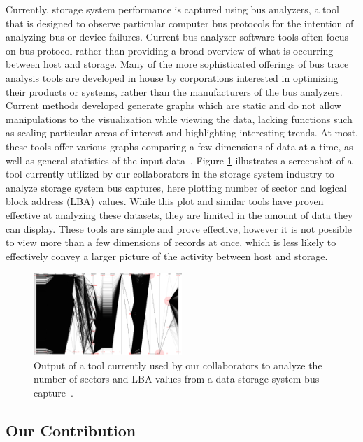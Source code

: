 \documentclass[journal]{vgtc}                %
\begin{document}
Currently, storage system performance is captured using bus analyzers, a tool that is designed to observe particular computer bus protocols for the intention of analyzing bus or device failures. Current bus analyzer software tools often focus on bus protocol rather than providing a broad overview of what is occurring between host and storage. Many of the more sophisticated offerings of bus trace analysis tools are developed in house by corporations interested in optimizing their products or systems, rather than the manufacturers of the bus analyzers. Current methods developed generate graphs which are static and do not allow manipulations to the visualization while viewing the data, lacking functions such as scaling particular areas of interest and highlighting interesting trends. At most, these tools offer various graphs comparing a few dimensions of data at a time, as well as general statistics of the input data~\cite{internal:understanding}. Figure \ref{fig:prev_tool2} illustrates a screenshot of a tool currently utilized by our collaborators in the storage system industry to analyze storage system bus captures, here plotting number of sector and logical block address (LBA) values. While this plot and similar tools have proven effective at analyzing these datasets, they are limited in the amount of data they can display. These tools are simple and prove effective, however it is not possible to view more than a few dimensions of records at once, which is less likely to effectively convey a larger picture of the activity between host and storage.

\begin{figure}[h!]
 \centering
 \includegraphics[width=0.5\textwidth]{images/prev_tool2.eps}
 \caption[Output of a tool currently used to analyze workload datasets.]{Output of a tool currently used by our collaborators to analyze the number of sectors and LBA values from a data storage system bus capture~\cite{internal:collab}.}
 \label{fig:prev_tool2}
\end{figure}

\subsection{Our Contribution}
\label{contribution}
\end{document}
